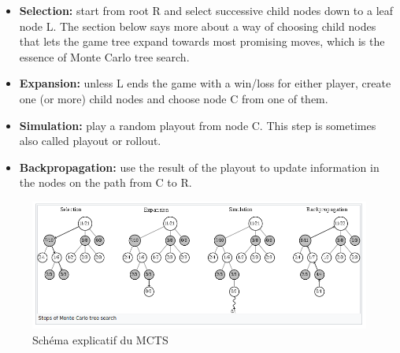 \documentclass{article}
\begin{document}
\begin{itemize}
    \item \textbf{Selection:} start from root R and select successive child nodes down to a leaf node L. The section below says more about a way of choosing child nodes that lets the game tree expand towards most promising moves, which is the essence of Monte Carlo tree search.
    \item \textbf{Expansion:} unless L ends the game with a win/loss for either player, create one (or more) child nodes and choose node C from one of them.
    \item \textbf{Simulation:} play a random playout from node C. This step is sometimes also called playout or rollout.
    \item \textbf{Backpropagation:} use the result of the playout to update information in the nodes on the path from C to R.
\end{itemize}

\begin{figure}[H]
    \centering
    \includegraphics[scale=0.5]{mcts.png}
    \caption{Schéma explicatif du MCTS}
\end{figure}
\end{document}
